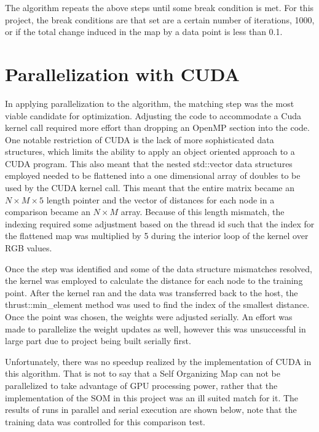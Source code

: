 \documentclass[11pt]{article}
\begin{document}
The algorithm repeats the above steps until some break condition is met. For this project, the break conditions are that set are a certain number of iterations, 1000, or if the total change induced in the map by a data point is less than 0.1.

\section{Parallelization with CUDA}

In applying parallelization to the algorithm, the matching step was the most viable candidate for optimization. Adjusting the code to accommodate a Cuda kernel call required more effort than dropping an OpenMP section into the code. One notable restriction of CUDA is the lack of more sophisticated data structures, which limits the ability to apply an object oriented approach to a CUDA program. This also meant that the nested std::vector data structures employed needed to be flattened into a one dimensional array of doubles to be used by the CUDA kernel call. This meant that the entire matrix became an \(N \times M \times 5\) length pointer and the vector of distances for each node in a comparison became an \(N \times M\) array. Because of this length mismatch, the indexing required some adjustment based on the thread id such that the index for the flattened map was multiplied by 5 during the interior loop of the kernel over RGB values. 


Once the step was identified and some of the data structure mismatches resolved, the kernel was employed to calculate the distance for each node to the training point. After the kernel ran and the data was transferred back to the host, the thrust::min\_element method was used to find the index of the smallest distance. Once the point was chosen, the weights were adjusted serially. An effort was made to parallelize the weight updates as well, however this was unsuccessful in large part due to project being built serially first.


Unfortunately, there was no speedup realized by the implementation of CUDA in this algorithm. That is not to say that a Self Organizing Map can not be parallelized to take advantage of GPU processing power, rather that the implementation of the SOM in this project was an ill suited match for it. The results of runs in parallel and serial execution are shown below, note that the training data was controlled for this comparison test.
\end{document}

